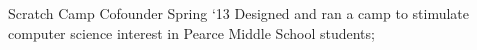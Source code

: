 \experience
    {Scratch Camp}
    {Cofounder}
    {Spring `13}
    {
        Designed and ran a camp to stimulate computer science interest in Pearce Middle School
        students;
    }
